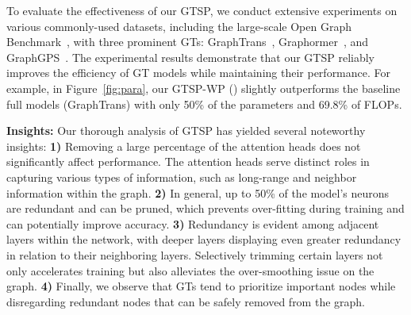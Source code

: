 \documentclass[letterpaper]{article} %
\begin{document}



To evaluate the effectiveness of our GTSP, we conduct extensive experiments on various commonly-used datasets, including the large-scale Open Graph Benchmark~\cite{ogb-dataset}, with three prominent GTs: GraphTrans~\cite{graphtrans}, Graphormer~\cite{graphormer-v1}, and GraphGPS~\cite{graphgps}. The experimental results demonstrate that our GTSP reliably improves the efficiency of GT models while maintaining their performance. For example, in Figure~\ref{fig:para},  our GTSP-WP (\text{\Large \textcolor{mygreen}{$\bullet$}})  slightly  outperforms the baseline full models (GraphTrans) with only 50\% of the parameters and 69.8\% of FLOPs. 

\textbf{Insights:} Our thorough analysis of GTSP has yielded several noteworthy insights: \textbf{1)} Removing a large percentage of the attention heads does not significantly affect performance. The attention heads serve distinct roles in capturing various types of information, such as long-range and neighbor information within the graph. \textbf{2)} In general, up to 50\% of the model's neurons are redundant and can be pruned, which prevents over-fitting during training and can potentially improve accuracy. \textbf{3)}  Redundancy is evident among adjacent layers within the network, with deeper layers displaying even greater redundancy in relation to their neighboring layers. Selectively trimming certain layers not only accelerates training but also alleviates the over-smoothing issue on the graph. \textbf{4)}  Finally, we observe that GTs tend to prioritize important nodes while disregarding redundant nodes that can be safely removed from the graph.
\end{document}
